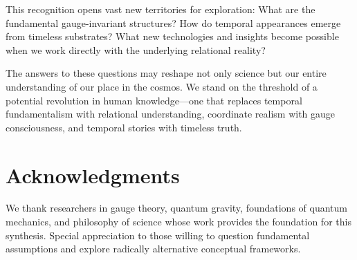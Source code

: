 \documentclass[11pt]{article}
\theoremstyle{definition}
\theoremstyle{plain}
\theoremstyle{remark}
\begin{document}
This recognition opens vast new territories for exploration: What are the fundamental gauge-invariant structures? How do temporal appearances emerge from timeless substrates? What new technologies and insights become possible when we work directly with the underlying relational reality?

The answers to these questions may reshape not only science but our entire understanding of our place in the cosmos. We stand on the threshold of a potential revolution in human knowledge—one that replaces temporal fundamentalism with relational understanding, coordinate realism with gauge consciousness, and temporal stories with timeless truth.

\section*{Acknowledgments}

We thank researchers in gauge theory, quantum gravity, foundations of quantum mechanics, and philosophy of science whose work provides the foundation for this synthesis. Special appreciation to those willing to question fundamental assumptions and explore radically alternative conceptual frameworks.
\end{document}
